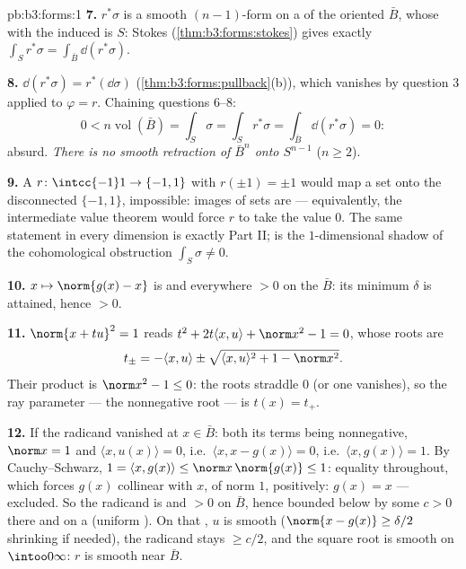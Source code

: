 \begin{solution}{pb:b3:forms:1}
\textbf{7.} $r^*\sigma$ is a smooth $(n-1)$-form on a
 of the  oriented $\bar B$, whose
 with the induced  is $S$: Stokes
(\cref{thm:b3:forms:stokes}) gives exactly
$\int_Sr^*\sigma = \int_{\bar B}\dd(r^*\sigma)$.

\textbf{8.} $\dd(r^*\sigma) = r^*(\dd\sigma)$
(\cref{thm:b3:forms:pullback}(b)), which vanishes by
question 3 applied to $\varphi = r$. Chaining questions
6--8:
\[
0 < n\operatorname{vol}(\bar B) = \int_S\sigma =
\int_Sr^*\sigma = \int_{\bar B}\dd(r^*\sigma) = 0 :
\]
absurd. \emph{There is no smooth retraction of $\bar B^n$
onto $S^{n-1}$} ($n \geq 2$).

\textbf{9.} A  $r\colon\intcc{-1}1\to\{-1,1\}$
with $r(\pm1) = \pm1$ would map a  set onto the
disconnected $\{-1, 1\}$, impossible:  images of
 sets are  --- equivalently, the
intermediate value theorem would force $r$ to take the value
$0$. The same statement in every dimension is exactly Part
II;  is the $1$-dimensional shadow of the
cohomological obstruction $\int_S\sigma \neq 0$.

\textbf{10.} $x \mapsto \norm{g(x) - x}$ is  and
everywhere $> 0$ on the  $\bar B$: its minimum
$\delta$ is attained, hence $> 0$.

\textbf{11.} $\norm{x + tu}^2 = 1$ reads $t^2 + 2t\langle x,
u\rangle + \norm x^2 - 1 = 0$, whose roots are
\[
t_\pm = -\langle x, u\rangle \pm \sqrt{\langle x,
u\rangle^2 + 1 - \norm x^2} .
\]
Their product is $\norm x^2 - 1 \leq 0$: the roots straddle
$0$ (or one vanishes), so the ray parameter --- the
nonnegative root --- is $t(x) = t_+$.

\textbf{12.} If the radicand vanished at $x \in \bar B$:
both its terms being nonnegative, $\norm x = 1$ and
$\langle x, u(x)\rangle = 0$, i.e.\ $\langle x, x -
g(x)\rangle = 0$, i.e.\ $\langle x, g(x)\rangle = 1$. By
Cauchy--Schwarz, $1 = \langle x, g(x)\rangle \leq
\norm x\,\norm{g(x)} \leq 1$: equality throughout, which
forces $g(x)$ collinear with $x$, of norm $1$, positively:
$g(x) = x$ --- excluded. So the radicand is  and
$> 0$ on $\bar B$, hence bounded below by some $c > 0$
there and on a  (uniform ). On that
, $u$ is smooth ($\norm{x - g(x)} \geq
\delta/2$ shrinking if needed), the radicand stays $\geq
c/2$, and the square root is smooth on $\intoo0\infty$: $r$
is smooth near $\bar B$.


\end{solution}
